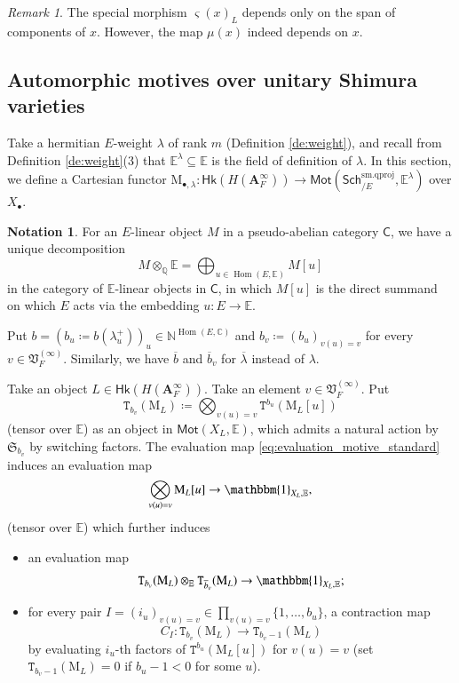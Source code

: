 \documentclass[12pt]{amsart}
\numberwithin{equation}{section}
\theoremstyle{plain}
\theoremstyle{definition}
\newtheorem{notation}[proposition]{Notation}
\theoremstyle{remark}
\newtheorem{remark}[proposition]{Remark}
\renewcommand{\b}[1]{\mathbf{#1}}
\renewcommand{\d}[1]{\mathbb{#1}}
\newcommand{\f}[1]{\mathfrak{#1}}
\renewcommand{\r}[1]{\mathrm{#1}}
\renewcommand{\sf}[1]{\mathsf{#1}}
\renewcommand{\(}{\left(}
\renewcommand{\)}{\right)}
\newcommand{\ol}[1]{\overline{#1}{}}
\newcommand{\bA}{\b A}
\newcommand{\dC}{\d C}
\newcommand{\dE}{\d E}
\newcommand{\dN}{\d N}
\newcommand{\dQ}{\d Q}
\newcommand{\fS}{\f S}
\newcommand{\fV}{\f V}
\newcommand{\rM}{\r M}
\newcommand{\sfC}{\sf C}
\newcommand{\tT}{\mathtt{T}}
\newcommand{\smq}{\r{sm.qproj}}
\newcommand{\Sch}{\sf{Sch}}
\newcommand{\Hk}{\sf{Hk}}
\newcommand{\Mot}{\sf{Mot}}
\DeclareMathOperator{\Hom}{Hom}
\begin{document}
\begin{remark}
The special morphism $\varsigma(x)_L$ depends only on the span of components of $x$. However, the map $\mu(x)$ indeed depends on $x$.
\end{remark}



\subsection{Automorphic motives over unitary Shimura varieties}
\label{ss:motive_automorphic}

Take a hermitian $E$-weight $\lambda$ of rank $m$ (Definition \ref{de:weight}), and recall from Definition \ref{de:weight}(3) that $\dE^\lambda\subseteq\dE$ is the field of definition of $\lambda$. In this section, we define a Cartesian functor $\rM_{\bullet,\lambda}\colon\Hk(H(\bA_F^\infty))\to\Mot(\Sch^\smq_{/E},\dE^\lambda)$ over $X_\bullet$.


\begin{notation}\label{no:place_decompostion}
For an $E$-linear object $M$ in a pseudo-abelian category $\sfC$, we have a unique decomposition
\[
M\otimes_\dQ\dE=\bigoplus_{u\in\Hom(E,\dE)}M[u]
\]
in the category of $\dE$-linear objects in $\sfC$, in which $M[u]$ is the direct summand on which $E$ acts via the embedding $u\colon E\to\dE$.
\end{notation}

Put $b=(b_u\coloneqq b(\lambda_u^+))_u\in\dN^{\Hom(E,\dC)}$ and $b_v\coloneqq(b_u)_{v(u)=v}$ for every $v\in\fV_F^{(\infty)}$. Similarly, we have $\ol{b}$ and $\ol{b}_v$ for $\ol\lambda$ instead of $\lambda$.

Take an object $L\in\Hk(H(\bA_F^\infty))$. Take an element $v\in\fV_F^{(\infty)}$. Put
\[
\tT_{b_v}(\rM_L)\coloneqq\bigotimes_{v(u)=v}\tT^{b_u}(\rM_L[u])
\]
(tensor over $\dE$) as an object in $\Mot(X_L,\dE)$, which admits a natural action by $\fS_{b_v}$ by switching factors. The evaluation map \eqref{eq:evaluation_motive_standard} induces an evaluation map
\[
\bigotimes_{v(u)=v}\rM_L[u]\to\mathbbm{1}_{X_L,\dE},
\]
(tensor over $\dE$) which further induces
\begin{itemize}
  \item an evaluation map
      \begin{align}\label{eq:evaluation_motive_automorphic_0}
      \tT_{b_v}(\rM_L)\otimes_\dE\tT_{\ol{b}_v}(\rM_L)\to\mathbbm{1}_{X_L,\dE};
      \end{align}

  \item for every pair $I=(i_u)_{v(u)=v}\in\prod_{v(u)=v}\{1,\dots,b_u\}$, a contraction map
      \[
      C_I\colon \tT_{b_v}(\rM_L)\to\tT_{b_v-1}(\rM_L)
      \]
      by evaluating $i_u$-th factors of $\tT^{b_u}(\rM_L[u])$ for $v(u)=v$ (set $\tT_{b_v-1}(\rM_L)=0$ if $b_u-1<0$ for some $u$).
\end{itemize}
\end{document}
